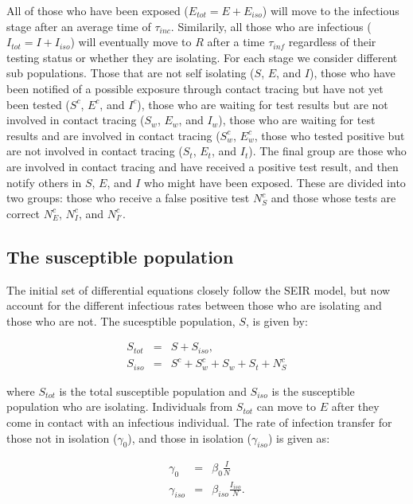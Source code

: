 \documentclass[notitlepage, superscriptaddress]{revtex4-2}
\begin{document}
All of those who have been exposed ($E_{tot} = E + E_{iso}$) will move to the infectious stage after an average time of $\tau_{inc}$. Similarily, all those who are infectious ($I_{tot} =  I + I_{iso}$) will eventually move to $R$ after a time $\tau_{inf}$ regardless of their testing status or whether they are isolating. For each stage we consider different sub populations. Those that are not self isolating ($S$, $E$, and $I$), those who have been notified of a possible exposure through contact tracing but have not yet been tested ($S^{c}$, $E^{c}$, and $I^{c}$), those who are waiting for test results but are not involved in contact tracing ($S_{w}$, $E_{w}$, and $I_{w}$), those who are waiting for test results and are involved in contact tracing ($S^{c}_{w}$, $E^{c}_{w}$, those who tested positive but are not involved in contact tracing ($S_{t}$, $E_{t}$, and $I_{t}$). The final group are those who are involved in contact tracing and have received a positive test result, and then notify others in $S$, $E$, and $I$ who might have been exposed. These are divided into two groups: those who receive a false positive test $N^{c}_{S}$ and those whose tests are correct $N^{c}_{E}$, $N^{c}_{I}$, and $N^{c}_{I'}$.

\subsection{The susceptible population}

The initial set of differential equations closely follow the SEIR model, but now account for the different infectious rates between those who are isolating and those who are not. The sucesptible population, $S$, is given by:

\begin{eqnarray}
\label{E:Stot}
S_{tot} &=& S + S_{iso}, \\
% 
S_{iso} &=& S^{c} + S^{c}_{w} + S_{w} + S_{t} + N^{c}_{S}
\end{eqnarray}

where $S_{tot}$ is the total susceptible population and $S_{iso}$ is the susceptible population who are isolating. Individuals from $S_{tot}$ can move to $E$ after they come in contact with an infectious individual. The rate of infection transfer for those not in isolation ($\gamma_{0}$), and those in isolation ($\gamma_{iso}$) is given as:

\begin{eqnarray}
\label{E:infectionrates}
\gamma_{0} &=& \beta_0 \frac{I}{N} \\
% 
\gamma_{iso} &=& \beta_{iso} \frac{I_{iso}}{N}.
\end{eqnarray}
\end{document}
